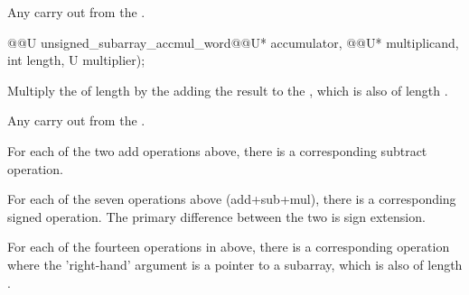 \begin{addedblock}
\begin{itemdescr}
\returns Any carry out from the .
\end{itemdescr}

\begin{itemdecl}
@@U unsigned_subarray_accmul_word@\tcode{\addmodif{(}}@U* accumulator, @@U* multiplicand, int length, U multiplier);    
\end{itemdecl}

\begin{itemdescr}
\effects Multiply the  of length  by the  adding the result to the , which is also of length .

\returns Any carry out from the .    
\end{itemdescr}

For each of the two add operations above, there is a corresponding subtract operation.

For each of the seven operations above (add+sub+mul), there is a corresponding signed operation. The primary difference between the two is sign extension.

For each of the fourteen operations in above, there is a corresponding operation where the 'right-hand' argument is a pointer to a subarray, which is also of length .
\end{addedblock}
